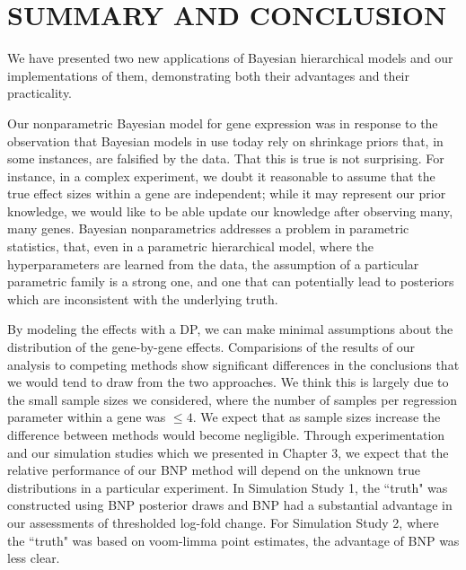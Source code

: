\chapter{SUMMARY AND CONCLUSION}

We have presented two new applications of Bayesian hierarchical models and our implementations of them, demonstrating both their advantages and their practicality.

Our nonparametric Bayesian model for gene expression was in response to the observation that Bayesian models in use today rely on shrinkage priors that, in some instances, are falsified by the data. That this is true is not surprising. For instance, in a complex experiment, we doubt it reasonable to assume that the true effect sizes within a gene are independent; while it may represent our prior knowledge, we would like to be able update our knowledge after observing many, many genes. Bayesian nonparametrics addresses a problem in parametric statistics, that, even in a parametric hierarchical model, where the hyperparameters are learned from the data, the assumption of a particular parametric family is a strong one, and one that can potentially lead to posteriors which are inconsistent with the underlying truth.

By modeling the effects with a DP, we can make minimal assumptions about the distribution of the gene-by-gene effects. Comparisions of the results of our analysis to competing methods show significant differences in the conclusions that we would tend to draw from the two approaches. We think this is largely due to the small sample sizes we considered, where the number of samples per regression parameter within a gene was $\le 4$. We expect that as sample sizes increase the difference between methods would become negligible. Through experimentation and our simulation studies which we presented in Chapter 3, we expect that the relative performance of our BNP method will depend on the unknown true distributions in a particular experiment. In Simulation Study 1, the ``truth" was constructed using BNP posterior draws and BNP had a substantial advantage in our assessments of thresholded log-fold change. For Simulation Study 2, where the ``truth" was based on voom-limma point estimates, the advantage of BNP was less clear.

